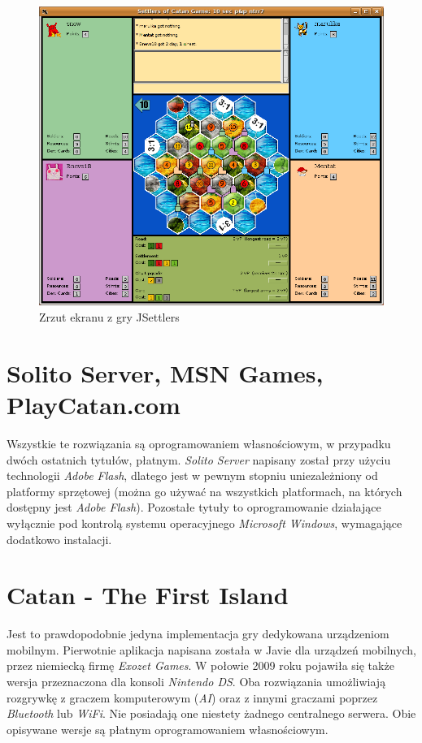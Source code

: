 \documentclass[11pt,twoside]{report}
\begin{document}
\begin{figure}[ht]
  \begin{center}
    \includegraphics[width=\linewidth]{jsettlers.png}
  \end{center}
  \caption{Zrzut ekranu z gry JSettlers}
  \label{jsettlers}
\end{figure}

\section{Solito Server, MSN Games, PlayCatan.com}
Wszystkie te rozwiązania są oprogramowaniem własnościowym, w przypadku
dwóch ostatnich tytułów, płatnym. \emph{Solito Server} napisany został
przy użyciu technologii \emph{Adobe Flash}, dlatego jest w pewnym
stopniu uniezależniony od platformy sprzętowej (można go używać na
wszystkich platformach, na których dostępny jest \emph{Adobe
  Flash}). Pozostałe tytuły to oprogramowanie działające wyłącznie pod
kontrolą systemu operacyjnego \emph{Microsoft Windows}, wymagające
dodatkowo instalacji.

\section{Catan - The First Island}
Jest to prawdopodobnie jedyna implementacja gry dedykowana urządzeniom
mobilnym. Pierwotnie aplikacja napisana została w Javie dla urządzeń
mobilnych, przez niemiecką firmę \emph{Exozet Games}. W połowie 2009
roku pojawiła się także wersja przeznaczona dla konsoli \emph{Nintendo
  DS}. Oba rozwiązania umożliwiają rozgrywkę z graczem komputerowym
(\emph{AI}) oraz z innymi graczami poprzez \emph{Bluetooth} lub
\emph{WiFi}. Nie posiadają one niestety żadnego centralnego
serwera. Obie opisywane wersje są płatnym oprogramowaniem
własnościowym.
\end{document}
